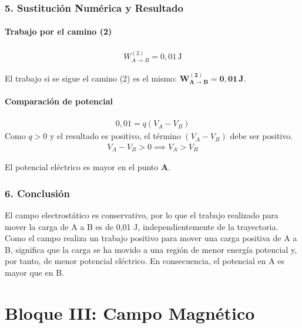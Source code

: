 \subsubsection*{5. Sustitución Numérica y Resultado}
\paragraph*{Trabajo por el camino (2)}
\begin{gather}
    W_{A \to B}^{(2)} = 0,01 \, \text{J}
\end{gather}
\begin{cajaresultado}
    El trabajo si se sigue el camino (2) es el mismo: $\boldsymbol{W_{A \to B}^{(2)} = 0,01 \, \textbf{J}}$.
\end{cajaresultado}
\paragraph*{Comparación de potencial}
\begin{gather}
    0,01 = q(V_A - V_B)
\end{gather}
Como $q > 0$ y el resultado es positivo, el término $(V_A - V_B)$ debe ser positivo.
\begin{gather}
    V_A - V_B > 0 \implies V_A > V_B
\end{gather}
\begin{cajaresultado}
    El potencial eléctrico es mayor en el punto \textbf{A}.
\end{cajaresultado}

\subsubsection*{6. Conclusión}
\begin{cajaconclusion}
El campo electrostático es conservativo, por lo que el trabajo realizado para mover la carga de A a B es de 0,01 J, independientemente de la trayectoria. Como el campo realiza un trabajo positivo para mover una carga positiva de A a B, significa que la carga se ha movido a una región de menor energía potencial y, por tanto, de menor potencial eléctrico. En consecuencia, el potencial en A es mayor que en B.
\end{cajaconclusion}

\newpage

\section{Bloque III: Campo Magnético}
\label{sec:mag_2019_jul_ext}

